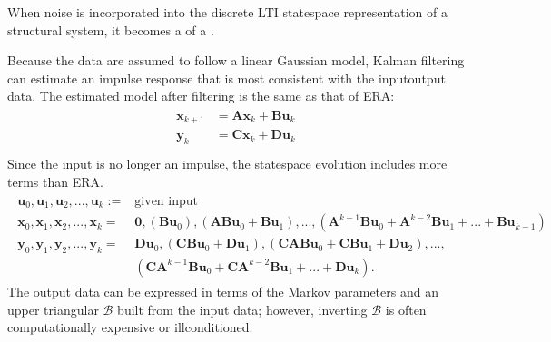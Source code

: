 \documentclass[letterpaper,10pt,english]{sphinxmanual}
\begin{document}
\sphinxAtStartPar
When noise is incorporated into the discrete LTI state\sphinxhyphen{}space
representation of a structural system, it becomes a  of a .

\sphinxAtStartPar
Because the data are assumed to follow a linear Gaussian model, Kalman
filtering can estimate an impulse response that is most consistent with
the input\sphinxhyphen{}output data. The estimated model after filtering is the same
as that of ERA:
\begin{equation*}
\begin{split}\begin{aligned}
    \mathbf{x}_{k+1} &= \mathbf{Ax}_{k} + \mathbf{Bu}_{k} \\
    \mathbf{y}_{k} &= \mathbf{Cx}_{k} + \mathbf{Du}_{k} \\
\end{aligned}\end{split}
\end{equation*}
\sphinxAtStartPar
Since the input is no longer an impulse, the state\sphinxhyphen{}space evolution
includes more terms than ERA.
\begin{equation*}
\begin{split}\begin{aligned}
    \mathbf{u}_{0},\mathbf{u}_{1},\mathbf{u}_{2},...,\mathbf{u}_{k} :=& \text{given input} \\
    \mathbf{x}_{0},\mathbf{x}_{1},\mathbf{x}_{2},...,\mathbf{x}_{k} =&  \mathbf{0},(\mathbf{Bu}_{0}),(\mathbf{ABu}_{0}+\mathbf{Bu}_{1}),...,(\mathbf{A}^{k-1}\mathbf{Bu}_{0}+\mathbf{A}^{k-2}\mathbf{Bu}_{1}+...+\mathbf{Bu}_{k-1}) \\
    \mathbf{y}_{0},\mathbf{y}_{1},\mathbf{y}_{2},...,\mathbf{y}_{k} =&  \mathbf{Du}_0,(\mathbf{CBu}_{0}+\mathbf{Du}_{1}),(\mathbf{CABu}_{0}+\mathbf{CBu}_{1}+\mathbf{Du}_{2}),..., \\
    & (\mathbf{CA}^{k-1}\mathbf{Bu}_{0}+\mathbf{CA}^{k-2}\mathbf{Bu}_{1}+...+\mathbf{Du}_{k}).
\end{aligned}\end{split}
\end{equation*}
\sphinxAtStartPar
The output data can be expressed in terms of the Markov parameters and
an upper triangular  \(\mathscr{B}\) built from the
input data; however, inverting \(\mathscr{B}\) is often
computationally expensive or ill\sphinxhyphen{}conditioned.
\end{document}
